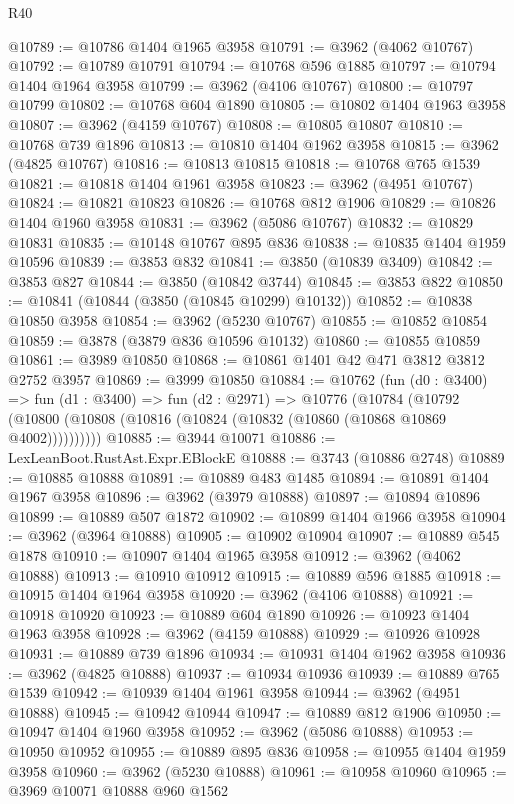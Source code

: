 \begin{lexlean}{R40}
\begin{coremodule}
@10789 := @10786 @1404 @1965 @3958
@10791 := @3962 (@4062 @10767)
@10792 := @10789 @10791
@10794 := @10768 @596 @1885
@10797 := @10794 @1404 @1964 @3958
@10799 := @3962 (@4106 @10767)
@10800 := @10797 @10799
@10802 := @10768 @604 @1890
@10805 := @10802 @1404 @1963 @3958
@10807 := @3962 (@4159 @10767)
@10808 := @10805 @10807
@10810 := @10768 @739 @1896
@10813 := @10810 @1404 @1962 @3958
@10815 := @3962 (@4825 @10767)
@10816 := @10813 @10815
@10818 := @10768 @765 @1539
@10821 := @10818 @1404 @1961 @3958
@10823 := @3962 (@4951 @10767)
@10824 := @10821 @10823
@10826 := @10768 @812 @1906
@10829 := @10826 @1404 @1960 @3958
@10831 := @3962 (@5086 @10767)
@10832 := @10829 @10831
@10835 := @10148 @10767 @895 @836
@10838 := @10835 @1404 @1959 @10596
@10839 := @3853 @832
@10841 := @3850 (@10839 @3409)
@10842 := @3853 @827
@10844 := @3850 (@10842 @3744)
@10845 := @3853 @822
@10850 := @10841 (@10844 (@3850 (@10845 @10299) @10132))
@10852 := @10838 @10850 @3958
@10854 := @3962 (@5230 @10767)
@10855 := @10852 @10854
@10859 := @3878 (@3879 @836 @10596 @10132)
@10860 := @10855 @10859
@10861 := @3989 @10850
@10868 := @10861 @1401 @42 @471 @3812 @3812 @2752 @3957
@10869 := @3999 @10850
@10884 := @10762
    (fun (d0 : @3400) =>
    fun (d1 : @3400) =>
    fun (d2 : @2971) =>
    @10776
      (@10784 (@10792 (@10800 (@10808 (@10816 (@10824 (@10832 (@10860 (@10868 @10869 @4002))))))))))
@10885 := @3944 @10071
@10886 := LexLeanBoot.RustAst.Expr.EBlockE
@10888 := @3743 (@10886 @2748)
@10889 := @10885 @10888
@10891 := @10889 @483 @1485
@10894 := @10891 @1404 @1967 @3958
@10896 := @3962 (@3979 @10888)
@10897 := @10894 @10896
@10899 := @10889 @507 @1872
@10902 := @10899 @1404 @1966 @3958
@10904 := @3962 (@3964 @10888)
@10905 := @10902 @10904
@10907 := @10889 @545 @1878
@10910 := @10907 @1404 @1965 @3958
@10912 := @3962 (@4062 @10888)
@10913 := @10910 @10912
@10915 := @10889 @596 @1885
@10918 := @10915 @1404 @1964 @3958
@10920 := @3962 (@4106 @10888)
@10921 := @10918 @10920
@10923 := @10889 @604 @1890
@10926 := @10923 @1404 @1963 @3958
@10928 := @3962 (@4159 @10888)
@10929 := @10926 @10928
@10931 := @10889 @739 @1896
@10934 := @10931 @1404 @1962 @3958
@10936 := @3962 (@4825 @10888)
@10937 := @10934 @10936
@10939 := @10889 @765 @1539
@10942 := @10939 @1404 @1961 @3958
@10944 := @3962 (@4951 @10888)
@10945 := @10942 @10944
@10947 := @10889 @812 @1906
@10950 := @10947 @1404 @1960 @3958
@10952 := @3962 (@5086 @10888)
@10953 := @10950 @10952
@10955 := @10889 @895 @836
@10958 := @10955 @1404 @1959 @3958
@10960 := @3962 (@5230 @10888)
@10961 := @10958 @10960
@10965 := @3969 @10071 @10888 @960 @1562

\end{coremodule}
\end{lexlean}
